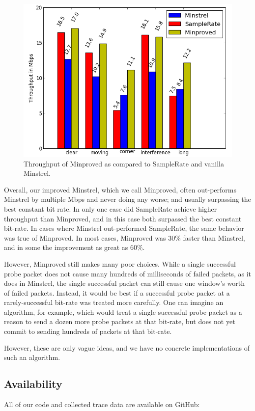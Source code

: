 \documentclass[twocolumn,10pt]{article}
\begin{document}
\begin{figure}[htb]
  \includegraphics[width=\linewidth]{mnVSspVSmp1.png}
  \caption{Throughput of Minproved as compared to SampleRate and
    vanilla Minstrel.}
\label{figure:4}
\end{figure}

Overall, our improved Minstrel, which we call Minproved, often
out-performs Minstrel by multiple Mbps and never doing any worse; and
usually surpassing the best constant bit rate.  In only one case did
SampleRate achieve higher throughput than Minproved, and in this case
both surpassed the best constant bit-rate.  In cases where Minstrel
out-performed SampleRate, the same behavior was true of Minproved.  In
most cases, Minproved was $30\%$ faster than Minstrel, and in some the
improvement as great as $60\%$.

However, Minproved still makes many poor choices.  While a single
successful probe packet does not cause many hundreds of milliseconds
of failed packets, as it does in Minstrel, the single successful
packet can still cause one window's worth of failed packets.  Instead,
it would be best if a successful probe packet at a rarely-successful
bit-rate was treated more carefully.  One can imagine an algorithm,
for example, which would treat a single successful probe packet as a
reason to send a dozen more probe packets at that bit-rate, but does
not yet commit to sending hundreds of packets at that bit-rate.

However, these are only vague ideas, and we have no concrete
implementations of such an algorithm.


\subsection{Availability}
All of our code and collected trace data are available on GitHub:
\end{document}
